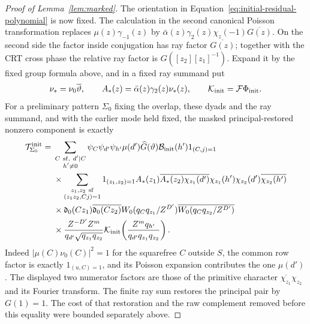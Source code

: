 \documentclass[11pt,a4paper]{article}
\numberwithin{equation}{section}
\numberwithin{figure}{section}
\theoremstyle{definition}
\theoremstyle{remark}
\begin{document}
\begin{proof}[Proof of Lemma~\ref{lem:marked}]
The orientation in Equation~\eqref{eq:initial-residual-polynomial}
is now fixed.  The calculation in the second canonical Poisson
transformation replaces \(\mu(z)\gamma_{-1}(z)\) by
\(\bar\alpha(z)\gamma_2(z)\chi_z(-1)\overline{G(z)}\).
On the second side the factor inside conjugation has ray factor
\(\overline{G(z)}\); together with the CRT cross phase the relative
ray factor is \(G([z_2][z_1]^{-1})\).  Expand it by the fixed group
formula above, and in a fixed ray summand put
\[
 \nu_*=\nu_0\overline\vartheta,\qquad
 A_*(z)=\bar\alpha(z)\gamma_2(z)\nu_*(z),\qquad
 \mathcal K_{\rm init}=\mathcal F\Phi_{\rm init}.
\]
For a preliminary pattern \(\Sigma_0\) fixing the overlap, these
dyads and the ray summand, and with the earlier mode held fixed, the masked
principal-restored nonzero component is exactly
\begin{equation}\label{eq:initial-formal-component}
 \begin{split}
 \mathcal T^{\rm init}_{\Sigma_0}={}&
 \sum_{\substack{C\ {\rm sf},\ d'\mid C\\h'\ne0}}
 \psi_C\psi_{d'}\psi_{h'}\mu(d')\widehat G(\vartheta)
 \mathcal B_{\rm init}(h')1_{(C,j)=1}\\
 &\times\sum_{\substack{z_1,z_2\ {\rm sf}\\(z_1z_2,Cj)=1}}
 1_{(z_1,z_2)=1}
 A_*(z_1)\overline{A_*(z_2)}
 \overline{\chi_{z_1}(d')}\chi_{z_1}(h')
 \chi_{z_2}(d')\overline{\chi_{z_2}(h')}\\
 &\times\mathfrak d_0(Cz_1)\overline{\mathfrak d_0(Cz_2)}
 W_0(q_Cq_{z_1}/Z^{D'})\overline{W_0(q_Cq_{z_2}/Z^{D'})}\\
 &\times\frac{Z^{-D'}Z^m}{q_{d'}\sqrt{q_{z_1}q_{z_2}}}
 \mathcal K_{\rm init}\!\left(
       \frac{Z^mq_{h'}}{q_{d'}q_{z_1}q_{z_2}}\right).
 \end{split}
\end{equation}
Indeed \(|\mu(C)\nu_0(C)|^2=1\) for the squarefree \(C\) outside
\(S\), the common row factor is exactly \(1_{(u,C)=1}\), and its
Poisson expansion contributes the one \(\mu(d')\).  The displayed
two numerator factors are those of the primitive character
\(\overline{\chi_{z_1}}\chi_{z_2}\) and its Fourier transform.
The finite ray sum restores the principal pair by \(G(1)=1\).
The cost of that restoration and the raw complement removed before
this equality were bounded separately above.


\end{proof}
\end{document}
